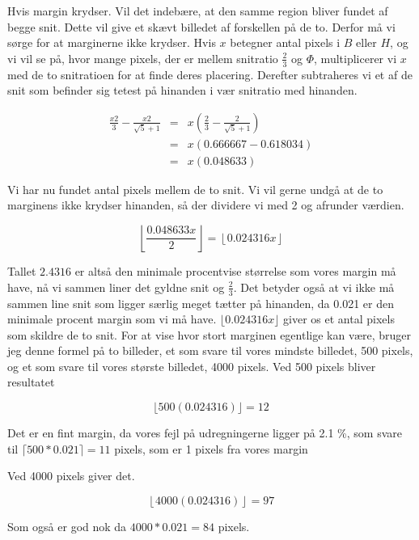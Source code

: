 Hvis margin krydser. Vil det indebære, at den samme region bliver fundet
af begge snit. Dette vil give et skævt billedet af forskellen på de to.
Derfor må vi sørge for at marginerne ikke krydser. Hvis $x$ betegner
antal pixels i $B$ eller $H$, og vi vil se på, hvor mange pixels, der er
mellem snitratio $\frac{2}{3}$ og $\varPhi$, multiplicerer vi $x$ med de
to snitratioen for at finde deres placering. Derefter subtraheres vi et
af de snit som befinder sig tetest på hinanden i vær snitratio med
hinanden.

\begin{eqnarray}
	\frac{x2}{3} - \frac{x2}{\sqrt{5}+1} & = & x(\frac{2}{3} - \frac{2}{\sqrt{5} + 1}) \nonumber \\
	& = & x(0.666667-0.618034) \\ \nonumber
	& = & x(0.048633)
\end{eqnarray}

Vi har nu fundet antal pixels mellem de to snit. Vi vil gerne undgå at
de to marginens ikke krydser hinanden, så der dividere vi med 2 og
afrunder værdien.

\begin{equation}
	\left\lfloor \frac{0.048633x}{2}\right\rfloor = \left\lfloor0.024316x \right\rfloor
\end{equation}

Tallet $2.4316$ er altså den minimale procentvise størrelse som vores
margin må have, nå vi sammen liner det gyldne snit og $\frac{2}{3}$.
Det betyder også at vi ikke må sammen line snit som ligger særlig
meget tætter på hinanden, da 0.021 er den minimale procent margin som vi må have.
$\lfloor 0.024316x \rfloor$ giver os et antal pixels som skildre de to snit. For at vise
hvor stort marginen egentlige kan være, bruger jeg denne formel på to
billeder, et som svare til vores mindste billedet, 500 pixels, og et
som svare til vores største billedet, 4000 pixels. Ved 500 pixels
bliver resultatet

\begin{equation}
	 \lfloor 500(0.024316)\rfloor = 12
\end{equation}

Det er en fint margin, da vores fejl på udregningerne ligger på 2.1 \%,
som svare til $\lceil 500*0.021 \rceil = 11$ pixels, som er 1 pixels fra vores
margin

Ved 4000 pixels giver det.

\begin{equation}
	 \left\lfloor 4000(0.024316)\right\rfloor = 97
\end{equation}

Som også er god nok da $4000*0.021 = 84$ pixels.
